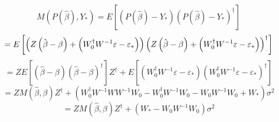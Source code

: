\documentclass{article}
\begin{document}
\begin{equation*}
M\left( P\left( \hat{\beta}\right) ,Y_{\ast }\right) =E\left[ \left( P\left( 
\hat{\beta}\right) -Y_{\ast }\right) \left( P\left( \hat{\beta}\right)
-Y_{\ast }\right) ^{\dagger }\right]
\end{equation*}%
\begin{equation*}
=E\left[ \left( Z\left( \hat{\beta}-\beta \right) +\left( W_{0}^{\dagger
}W^{-1}\varepsilon -\varepsilon _{\ast }\right) \right) \left( Z\left( \hat{%
\beta}-\beta \right) +\left( W_{0}^{\dagger }W^{-1}\varepsilon -\varepsilon
_{\ast }\right) \right) ^{\dagger }\right]
\end{equation*}%
\begin{equation*}
=ZE\left[ \left( \hat{\beta}-\beta \right) \left( \hat{\beta}-\beta \right)
^{\dagger }\right] Z^{\dagger }+E\left[ \left( W_{0}^{\dagger
}W^{-1}\varepsilon -\varepsilon _{\ast }\right) \left( W_{0}^{\dagger
}W^{-1}\varepsilon -\varepsilon _{\ast }\right) ^{\dagger }\right]
\end{equation*}%
\begin{equation*}
=ZM\left( \hat{\beta},\beta \right) Z^{\dagger }+\left( W_{0}^{\dagger
}W^{-1}WW^{-1}W_{0}-W_{0}^{\dagger }W^{-1}W_{0}-W_{0}W^{-1}W_{0}+W_{\ast
}\right) \sigma ^{2}
\end{equation*}%
\begin{equation*}
=ZM\left( \hat{\beta},\beta \right) Z^{\dagger }+\left( W_{\ast
}-W_{0}W^{-1}W_{0}\right) \sigma ^{2}
\end{equation*}
\end{document}
